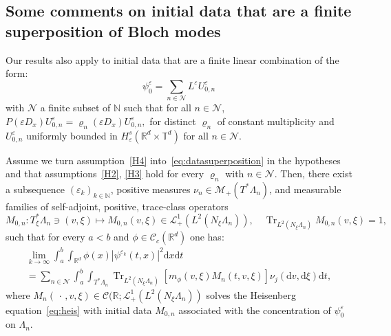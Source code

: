 \documentclass[AHL,Unicode,longabstracts]{cedram}
\DeclareMathOperator{\Trr}{Tr}
\newcommand*\R{{\mathbb R}}
\newcommand*\N{{\mathbb N}}
\newcommand*\T{{\mathbb T}}
\newcommand*\eps{\varepsilon}
\newcommand*\Tr{\Trr}
\numberwithin{equation}{section}
\newcommand*{\dd}{\mathrm{d}}
\newcommand*{\dt}{\dd t}
\newcommand*{\dx}{\dd x}
\newcommand*{\dv}{\dd v}
\newcommand*{\dxi}{\dd \xi}
\begin{document}
\subsection{Some comments on initial data that are a finite superposition of Bloch modes}\label{sec:superposition}
Our results also apply to initial data that are a finite linear combination of the form:
\begin{equation}\label{eq:datasuperposition}
\psi^\eps_0=\sum_{n\in{\mathcal N}} L^\eps U^\eps_{0,n}
\end{equation}
with ${\mathcal N}$ a finite subset of $\N$ such that for all $n\in{\mathcal N}$, $P(\eps D_x) U^\eps_{0,n}= \varrho_n(\eps D_x) U^\eps_{0,n},$ for distinct $\varrho_n$ of constant multiplicity and $U^\eps_{0,n}$ uniformly bounded in $H^s_{\eps}(\R^d\times \T^d)$ for all $n\in{\mathcal N}$.

\begin{prop}\label{theo:superposition}
Assume we turn assumption~\eqref{H4} into~\eqref{eq:datasuperposition} in the hypotheses and that assumptions~\eqref{H2}, \eqref{H3} hold for every $\varrho_n$ with $n\in{\mathcal N}$. Then, there exist a subsequence $(\eps_k)_{k\in\N}$, positive measures $\nu_n\in\mathcal{M}_+(T^*\Lambda_n)$, and measurable families of self-adjoint, positive, trace-class operators
\[
M_{0,n}:T^*_\xi\Lambda_n\ni (v,\xi)\longmapsto M_{0,n}(v,\xi)\in \mathcal{L}_+^1(L^2(N_\xi\Lambda_n)),\quad \Tr_{L^2(N_\xi\Lambda_n)} M_{0,n}(v,\xi)=1,
\]
such that for every $a<b$ and $\phi\in \mathcal{C}_c(\R^d)$ one has:
\begin{multline*}
\lim_{k\to\infty}\int_a^b\int_{\R^d}\phi(x)|\psi^{\eps_k}(t,x)|^2\dx\dt\\
=\sum_{n\in{\mathcal N}}\int_a^b \int_{T^*\Lambda_n}\Tr_{L^2(N_\xi\Lambda_n)}\left[m_\phi(v,\xi)M_n(t,v,\xi)\right]\nu_j(\dv,\dxi)\dt,
\end{multline*}
where $M_n(\,\cdot\,, v,\xi)\in \mathcal{C}(\R;\mathcal{L}_+^1(L^2(N_\xi\Lambda_n))$ solves the Heisenberg equation~\eqref{eq:heis} with initial data $M_{0,n}$ associated with the concentration of $\psi^\eps_0$ on $\Lambda_n$.
\end{prop}
\end{document}
